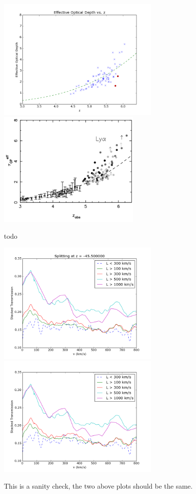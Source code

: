 \documentclass[11pt]{article}
\begin{document}
\begin{figure}[h]
  \centering
  \includegraphics[width=8cm]{tauDistribution_samescale.png}
  \includegraphics[width=7cm]{fan2006.png}
  \caption{todo}
  \label{fig:todo}
\end{figure}


\begin{figure}[h]
  \centering
  \includegraphics[width=8cm]{Stack_SanityCut.png}
  \includegraphics[width=8cm]{Stack_SanityCutCorrect.png}
  \caption{This is a sanity check, the two above plots should be the same.}
  \label{fig:todo}
\end{figure}
\end{document}
